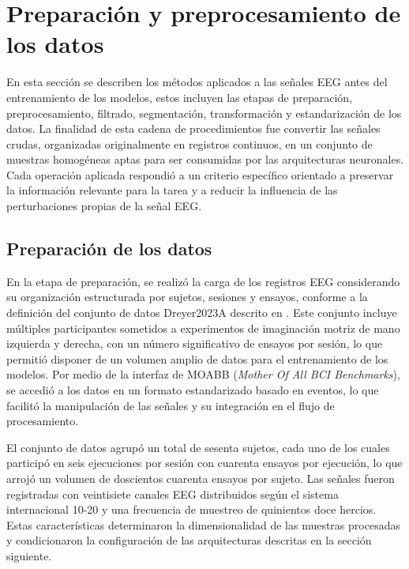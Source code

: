 
\FloatBarrier

\section{Preparación y preprocesamiento de los datos}

En esta sección se describen los métodos aplicados a las señales EEG antes del entrenamiento de los modelos, estos incluyen las etapas de preparación, preprocesamiento, filtrado, segmentación, transformación y estandarización de los datos. La finalidad de esta cadena de procedimientos fue convertir las señales crudas, organizadas originalmente en registros continuos, en un conjunto de muestras homogéneas aptas para ser consumidas por las arquitecturas neuronales. Cada operación aplicada respondió a un criterio específico orientado a preservar la información relevante para la tarea y a reducir la influencia de las perturbaciones propias de la señal EEG.

\subsection{Preparación de los datos}

En la etapa de preparación, se realizó la carga de los registros EEG considerando su organización estructurada por sujetos, sesiones y ensayos, conforme a la definición del conjunto de datos Dreyer2023A descrito en \cite{dreyer2023large}. Este conjunto incluye múltiples participantes sometidos a experimentos de imaginación motriz de mano izquierda y derecha, con un número significativo de ensayos por sesión, lo que permitió disponer de un volumen amplio de datos para el entrenamiento de los modelos. Por medio de la interfaz de MOABB (\textit{Mother Of All BCI Benchmarks}), se accedió a los datos en un formato estandarizado basado en eventos, lo que facilitó la manipulación de las señales y su integración en el flujo de procesamiento.

El conjunto de datos agrupó un total de sesenta sujetos, cada uno de los cuales participó en seis ejecuciones por sesión con cuarenta ensayos por ejecución, lo que arrojó un volumen de doscientos cuarenta ensayos por sujeto. Las señales fueron registradas con veintisiete canales EEG distribuidos según el sistema internacional 10-20 y una frecuencia de muestreo de quinientos doce hercios. Estas características determinaron la dimensionalidad de las muestras procesadas y condicionaron la configuración de las arquitecturas descritas en la sección siguiente.

